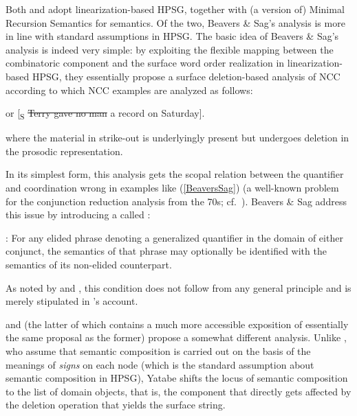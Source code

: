 \documentclass[output=paper
                ,modfonts
 	        ,biblatex
                ,babelshorthands
                ,newtxmath
                ,draftmode
                ,colorlinks, citecolor=brown
]{langscibook}
\begin{document}
Both \citet{BS2004a} and \citet{Yatabe2001a} adopt linearization-based HPSG, together
with (a version of) Minimal Recursion Semantics for
semantics. Of the two, Beavers \& Sag's
analysis is more in line with standard assumptions in HPSG. The basic
idea of Beavers \& Sag's analysis is indeed very simple: by exploiting the flexible
mapping between the combinatoric component and the surface word order
realization in linearization-based HPSG, they essentially propose a
surface deletion-based analysis of NCC according to which NCC examples
are analyzed as follows:

\begin{exe}
 \ex\label{BeaversSag} or
  [\textsubscript{S} \sout{Terry gave no man} a record on Saturday]. 
\end{exe}
where the material in strike-out is underlyingly present but undergoes
deletion in the prosodic representation.

In its simplest form, this analysis gets the scopal relation between
the quantifier and coordination wrong in examples like (\ref{BeaversSag}) (a
well-known problem for the conjunction reduction analysis from the
70s; cf.\ \citealt{partee70}\addpages). 
Beavers \& Sag address this issue by introducing a  called
:

\begin{exe}
 \ex\label{OQM}
  : For any elided phrase 
  denoting a generalized quantifier in the 
  domain of either conjunct, the semantics of that phrase may
  optionally be identified with the semantics of its non-elided
  counterpart.
\end{exe}
As noted by \citet{levine11}\addpages and \citet[Section~3.2.1]{kubota-levine-coord}, this condition
does not follow from any general principle and is merely stipulated in
\citeauthor{BS2004a}'s account.

\citet{Yatabe2001a} and \citet{yatabe-tam2017} (the latter of which contains a
much more accessible exposition of essentially the same proposal as
the former) propose a somewhat different analysis. Unlike \citeauthor{BS2004a}, who
assume that semantic composition is carried out on the basis of the
meanings of \emph{signs} on each node (which is the standard assumption
about semantic composition in HPSG), Yatabe shifts the locus of
semantic composition to the list of domain objects, that is, the
component that directly gets affected by the deletion operation that
yields the surface string.
\end{document}

